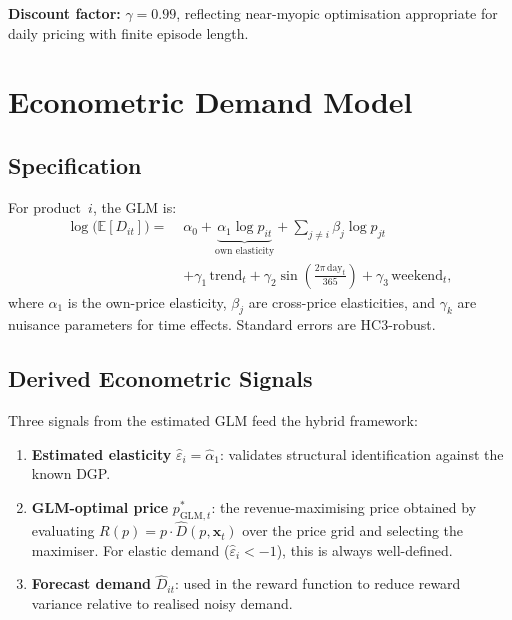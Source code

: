 \documentclass[journal, 10pt, twoside]{IEEEtran}
\begin{document}
\smallskip\noindent\textbf{Discount factor:}
$\gamma = 0.99$, reflecting near-myopic optimisation appropriate for
daily pricing with finite episode length.

\section{Econometric Demand Model}
\label{sec:glm}

\subsection{Specification}

For product~$i$, the GLM is:
\begin{align}
  \log\bigl(\mathbb{E}[D_{it}]\bigr) =\;
  &\alpha_0
  + \underbrace{\alpha_1 \log p_{it}}_{\text{own elasticity}}
  + \sum_{j\neq i}\beta_j \log p_{jt} \nonumber\\
  &+ \gamma_1\,\text{trend}_t
  + \gamma_2\sin\!\!\left(\tfrac{2\pi\,\text{day}_t}{365}\right)
  + \gamma_3\,\text{weekend}_t,
  \label{eq:glm}
\end{align}
where $\alpha_1$ is the own-price elasticity, $\beta_j$ are cross-price
elasticities, and $\gamma_k$ are nuisance parameters for time effects.
Standard errors are HC3-robust.

\subsection{Derived Econometric Signals}

Three signals from the estimated GLM feed the hybrid framework:
\begin{enumerate}
  \item \textbf{Estimated elasticity} $\hat{\varepsilon}_i = \hat{\alpha}_1$:
    validates structural identification against the known DGP.
  \item \textbf{GLM-optimal price} $p^*_{\text{GLM},t}$: the
    revenue-maximising price obtained by evaluating
    $R(p)=p\cdot\hat{D}(p,\mathbf{x}_t)$ over the price grid and
    selecting the maximiser. For elastic demand ($\hat{\varepsilon}_i < -1$),
    this is always well-defined.
  \item \textbf{Forecast demand} $\hat{D}_{it}$: used in the reward
    function to reduce reward variance relative to realised noisy demand.
\end{enumerate}
\end{document}
